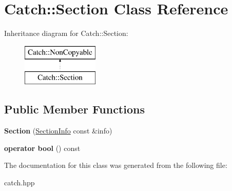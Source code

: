 \hypertarget{classCatch_1_1Section}{}\section{Catch\+:\+:Section Class Reference}
\label{classCatch_1_1Section}
Inheritance diagram for Catch\+:\+:Section\+:\begin{figure}[H]
\begin{center}
\leavevmode
\includegraphics[height=2.000000cm]{classCatch_1_1Section}
\end{center}
\end{figure}
\subsection*{Public Member Functions}
\begin{DoxyCompactItemize}
\item 
{\bfseries Section} (\hyperlink{structCatch_1_1SectionInfo}{Section\+Info} const \&info)\hypertarget{classCatch_1_1Section_a68fd4e51e8981aaa7ddb00d8a6abd099}{}\label{classCatch_1_1Section_a68fd4e51e8981aaa7ddb00d8a6abd099}

\item 
{\bfseries operator bool} () const \hypertarget{classCatch_1_1Section_a6c9be48e8ba0611c4aa601102e706f3b}{}\label{classCatch_1_1Section_a6c9be48e8ba0611c4aa601102e706f3b}

\end{DoxyCompactItemize}


The documentation for this class was generated from the following file\+:\begin{DoxyCompactItemize}
\item 
catch.\+hpp\end{DoxyCompactItemize}

